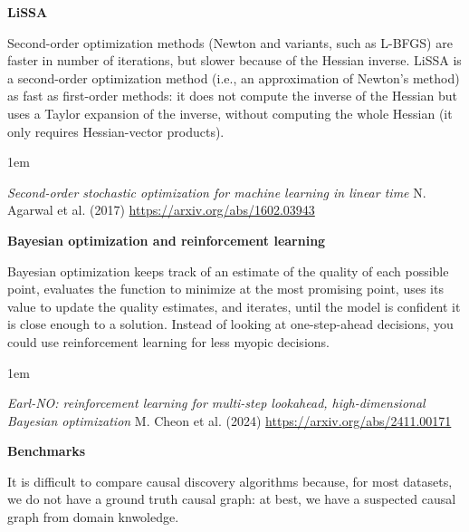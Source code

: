 \documentclass[a5paper]{article}
\newenvironment{reference}{%
  \medskip\goodbreak
  \parskip 0pt
  \raggedright
  \leftskip 1em
  \obeylines
}{\par\medskip\goodbreak}
\def\section#1{\clearpage{\vspace*{0cm}\LARGE\centering\bfseries #1\par\bigskip\bigskip}}
\def\subsection#1{{\par\bigskip\goodbreak\large\bfseries #1\par}}
\begin{document}
\subsection{LiSSA}

Second-order optimization methods (Newton and variants, such as L-BFGS)
are faster in number of iterations, but slower because of the Hessian inverse.
LiSSA is a second-order optimization method (i.e., an approximation of Newton's method)
as fast as first-order methods: it does not compute the inverse of the Hessian
but uses a Taylor expansion of the inverse, without computing the whole Hessian
(it only requires Hessian-vector products).

\begin{reference}
  \emph{Second-order stochastic optimization  for machine learning in linear time}
  N. Agarwal et al. (2017)
  \url{https://arxiv.org/abs/1602.03943}
\end{reference}

\subsection{Bayesian optimization and reinforcement learning}

Bayesian optimization
keeps track of an estimate of the quality of each possible point,
evaluates the function to minimize at the most promising point,
uses its value to update the quality estimates, and iterates,
until the model is confident it is close enough to a solution.
Instead of looking at one-step-ahead decisions,
you could use reinforcement learning for less myopic decisions.

\begin{reference}
  \emph{Earl-NO: reinforcement learning  for multi-step lookahead,  high-dimensional Bayesian optimization}
  M. Cheon et al. (2024)
  \url{https://arxiv.org/abs/2411.00171}
\end{reference}

\section{Causal Discovery}
\subsection{Benchmarks}

It is difficult to compare causal discovery algorithms because,
for most datasets, we do not have a ground truth causal graph:
at best, we have a suspected causal graph from domain knwoledge.
\end{document}

